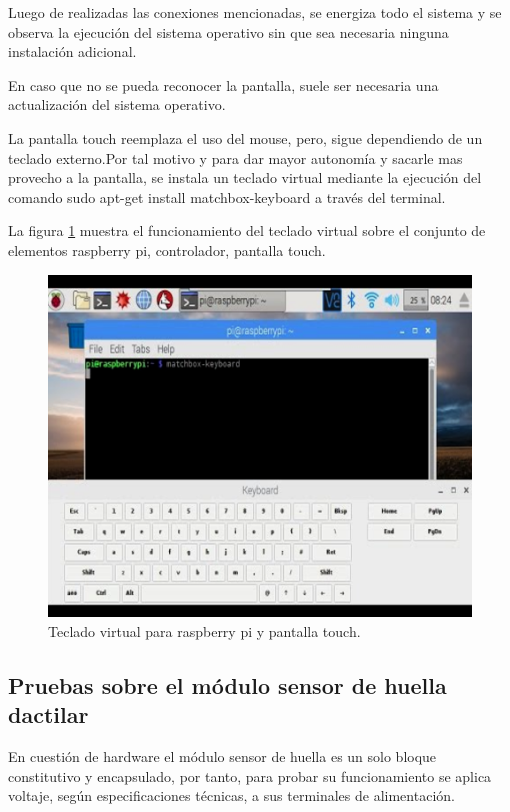 Luego de realizadas las conexiones mencionadas, se energiza todo el sistema y se observa la ejecución del sistema operativo sin que sea necesaria ninguna instalación adicional.
 
En caso que no se pueda reconocer la pantalla, suele ser necesaria una actualización del sistema operativo.

La pantalla touch reemplaza el uso del mouse, pero, sigue dependiendo de un teclado externo.Por tal motivo y para dar mayor autonomía y sacarle mas provecho a la pantalla, se instala un teclado virtual mediante la ejecución del comando sudo apt-get install matchbox-keyboard a través del terminal.

La figura \ref{fig:teclado} muestra el funcionamiento del teclado virtual sobre el conjunto de elementos raspberry pi, controlador, pantalla touch.

\begin{figure}[h]
	\centering
	\includegraphics[scale =.7]{./Figures/teclado.png}
	\caption{Teclado virtual para raspberry pi y pantalla touch.}
	\label{fig:teclado}
\end{figure}


\subsection{Pruebas sobre el módulo sensor de huella dactilar}

En cuestión de hardware el módulo sensor de huella es un solo bloque constitutivo y encapsulado, por tanto, para probar su funcionamiento se aplica voltaje, según especificaciones técnicas, a sus terminales de alimentación.

